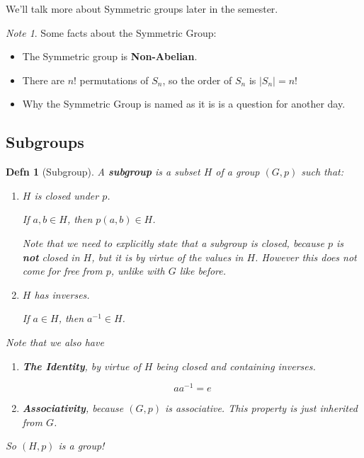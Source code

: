 \documentclass[12pt]{article}
\newtheorem{definition}{Defn}
\theoremstyle{remark}
\theoremstyle{remark}
\theoremstyle{remark}
\theoremstyle{remark}
\theoremstyle{remark}
\newtheorem*{note}{Note}
\begin{document}
We'll talk more about Symmetric groups later in the semester.

\begin{note}
  Some facts about the Symmetric Group:

	\begin{itemize}
		\item The Symmetric group is {\bf Non-Abelian}.
		\item There are $n!$ permutations of $S_n$, so the order of $S_n$ is $|S_n|
			      = n!$
		\item Why the Symmetric Group is named as it is is a question for another
		      day.
	\end{itemize}
\end{note}

\subsection{Subgroups}

\begin{definition}[Subgroup]
	A {\bf subgroup} is a subset $H$ of a group $(G, p)$ such that:

	\begin{enumerate}
		\item $H$ is closed under $p$.

		      If $a, b \in H$, then $p(a, b) \in H$.

		      Note that we {\it need} to explicitly state that a subgroup is closed,
		      because $p$ is {\bf not} closed in $H$, but it {\it is} by virtue of the
		      values in $H$. However this does not come for free from $p$, unlike with
		      $G$ like before.

		\item $H$ has inverses.

		      If $a \in H$, then $a^{-1} \in H$.
	\end{enumerate}

	Note that we also have

	\begin{enumerate}
		\item {\bf The Identity}, by virtue of $H$ being closed and containing
		      inverses.

		      \[
			      a a^{-1} = e
		      \]

		\item {\bf Associativity}, because $(G, p)$ is associative. This property is
		      just inherited from $G$.
	\end{enumerate}

	So $(H, p)$ is a group!
\end{definition}
\end{document}
